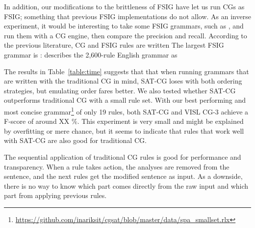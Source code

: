 In addition, our modifications to the brittleness of FSIG have let us run CGs as FSIG; something that previous FSIG implementations do not allow.
As an inverse experiment, it would be interesting to take some FSIG grammars, such as \cite{voutilainen1997fsig}, and run them with a CG engine, then compare the precision and recall. 
According to the previous literature, CG and FSIG rules are written 
The largest FSIG grammar is : \cite{voutilainen1998} describes the 2,600-rule English grammar as 


The results in Table~\ref{table:time} suggests that that when running grammars that are written
with the traditional CG in mind, SAT-CG loses with both ordering
strategies, but emulating order fares better.
We also tested whether SAT-CG outperforms traditional CG with a
small rule set. With our best performing and most concise
grammar\footnote{\url{https://github.com/inariksit/cgsat/blob/master/data/spa\_smallset.rlx}}
of only 19 rules, both SAT-CG and VISL CG-3  achieve a F-score of
around XX \%. This experiment is very small and might be explained by
overfitting or mere chance, but it seems to indicate that rules that
work well with SAT-CG are also good for traditional CG.







The sequential application of traditional CG rules is good for
performance and transparency. When a rule takes action, the analyses
are removed from the sentence, and the next rules get the modified
sentence as input. 
As a downside, there is no way to know which part comes directly from the
raw input and which part from applying previous rules.

